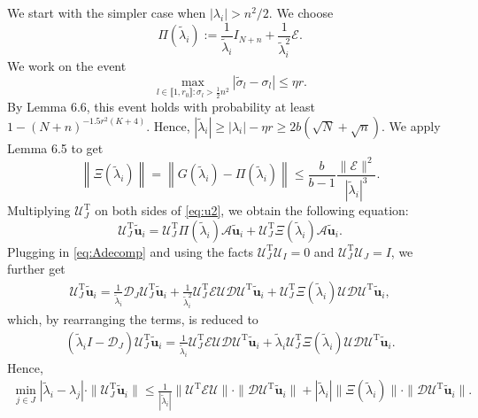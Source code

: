 \documentclass[reqno]{amsart}
\newcommand{\T}{\mathrm{T}}
\theoremstyle{plain}
\theoremstyle{definition}
\begin{document}
We start with the simpler case when $|\lambda_i|>n^2/2$. We choose $$\Pi(\widetilde\lambda_i):=\frac{1}{\widetilde \lambda_i} I_{N+n} + \frac{1}{\widetilde \lambda_i^2} \mathcal E.$$ We work on the event $$\max_{l \in \llbracket 1, r_0\rrbracket : \sigma_l >\frac{1}{2}n^2} |\widetilde \sigma_l - \sigma_l |\le \eta r.$$ By Lemma 6.6, this event holds with probability at least $1-(N+n)^{-1.5r^2(K+4)}$. Hence, $|\widetilde \lambda_i| \ge |\lambda_i| -\eta r \ge 2b(\sqrt N + \sqrt n)$. We apply Lemma 6.5 to get
\begin{equation}\label{eq:case21}
\left\| \Xi(\widetilde \lambda_i) \right\|=\left\| G(\widetilde{\lambda}_i) - \Pi(\widetilde{\lambda}_i)\right\| \le \frac{b}{b-1}\frac{\|\mathcal E\|^2}{|\widetilde{\lambda}_i|^3}.
\end{equation}
Multiplying $\mathcal U_J^\T$ on both sides of \eqref{eq:u2}, we obtain the following equation: 
\begin{equation*}
\mathcal U_J^\T \widetilde{\mathbf u}_i = \mathcal U_J^\T \Pi(\widetilde \lambda_i) \mathcal A \widetilde{\mathbf u}_i + \mathcal U_J^\T \Xi(\widetilde \lambda_i)\mathcal A \widetilde{\mathbf u}_i.
\end{equation*}
Plugging in \eqref{eq:Adecomp} and using the facts $\mathcal U_J^\T \mathcal U_I =0$ and $\mathcal U_J^\T \mathcal U_J =I$, we further get
\begin{align*}
\mathcal U_J^\T \widetilde{\mathbf u}_i = \frac{1}{\widetilde \lambda_i} \mathcal D_J \mathcal U_J^\T \widetilde{\mathbf u}_i +  \frac{1}{\widetilde \lambda_i^2} \mathcal U_J^\T \mathcal E \mathcal U \mathcal D \mathcal U^\T \widetilde{\mathbf u}_i + \mathcal U_J^\T \Xi(\widetilde \lambda_i) \mathcal U \mathcal D \mathcal U^\T  \widetilde{\mathbf u}_i,
\end{align*}
which, by rearranging the terms, is reduced to
\begin{align*}
(\widetilde \lambda_i I- \mathcal D_J)\mathcal U_J^\T \widetilde{\mathbf u}_i = \frac{1}{\widetilde \lambda_i} \mathcal U_J^\T \mathcal E \mathcal U \mathcal D \mathcal U^\T \widetilde{\mathbf u}_i + \widetilde \lambda_i \mathcal U_J^\T \Xi(\widetilde \lambda_i) \mathcal U \mathcal D \mathcal U^\T  \widetilde{\mathbf u}_i.
\end{align*}
Hence, 
\begin{align*}
\min_{j\in J} |\widetilde \lambda_i - \lambda_j| \cdot \|\mathcal U_J^\T \widetilde{\mathbf u}_i\| \le \frac{1}{|\widetilde \lambda_i|} \|  \mathcal U^\T \mathcal E \mathcal U\| \cdot \|\mathcal D \mathcal U^\T \widetilde{\mathbf u}_i\| + |\widetilde \lambda_i| \|\Xi(\widetilde \lambda_i)\| \cdot \|\mathcal D \mathcal U^\T \widetilde{\mathbf u}_i\|.
\end{align*}
\end{document}
